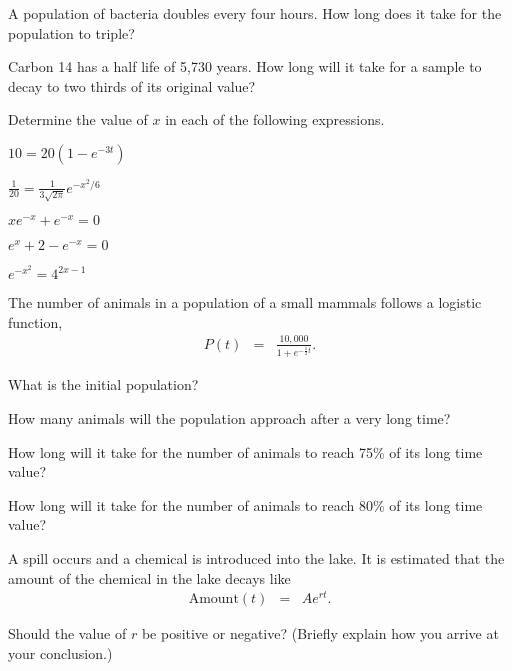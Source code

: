 \begin{problem}
\item A population of bacteria doubles every four hours. How long does
  it take for the population to triple?
  \vfill
\item Carbon 14 has a half life of 5,730 years. How long will it take
  for a sample to decay to two thirds of its original value?
  \vfill
\clearpage

\item Determine the value of $x$ in each of the following expressions.
  \begin{subproblem}
  \item $10 = 20\left( 1 - e^{-3t} \right)$
    \vfill
  \item $\frac{1}{20} =  \frac{1}{3\sqrt{2\pi}} e^{-x^2/6}$
    \vfill
  \item $xe^{-x} + e^{-x} = 0$
    \vfill
    \clearpage
  \item $e^{x} + 2 - e^{-x} = 0$
    \vfill
  \item $e^{-x^2} = 4^{2x-1}$
    \vfill
  \end{subproblem}

  \clearpage

\item The number of animals in a population of a small mammals follows
  a logistic function,
  \begin{eqnarray*}
    P(t) & = & \frac{10,000}{1+e^{-\frac{1}{2}t}}.
  \end{eqnarray*}
  \begin{subproblem}
  \item What is the initial population?
    \vspace{4em}
  \item How many animals will the population approach after a very
    long time?  
    \vspace{4em}
  \item How long will it take for the number of animals to reach 75\%
    of its long time value?
    \vfill
  \item How long will it take for the number of animals to reach 80\%
    of its long time value?
    \vfill
  \end{subproblem}

\clearpage

\item A spill occurs and a chemical is introduced into the lake. It is
  estimated that the amount of the chemical in the lake decays like
  \begin{eqnarray*}
    \mathrm{Amount}(t) & = & A e^{rt}.
  \end{eqnarray*}
  \begin{subproblem}
  \item Should the value of $r$ be positive or negative? (Briefly
    explain how you arrive at your conclusion.)  
    \vspace{5em}


\end{subproblem}
\end{problem}
